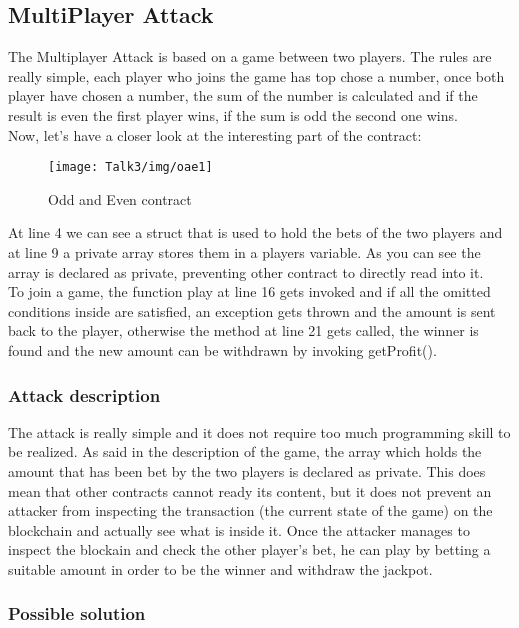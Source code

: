 \subsection{MultiPlayer Attack}
The Multiplayer Attack is based on a game between two players. The rules are really simple, each player who joins the game has top chose a number, once both player have chosen a number, the sum of the number is calculated and if the result is even the first player wins, if the sum is odd the second one wins.
\\Now, let's have a closer look at the interesting part of the contract:
\begin{figure}[H]
\begin{center}
\texttt{[image: Talk3/img/oae1]}
\end{center}
\caption{Odd and Even contract}
\label{label}
\end{figure}
At line 4 we can see a struct that is used to hold the bets of the two players and at line 9 a private array stores them in a players variable. As you can see the array is declared as private, preventing other contract to directly read into it.\\
To join a game,  the function play at line 16 gets invoked and if all the omitted conditions inside are satisfied, an exception gets thrown and the amount is sent back to the player, otherwise the method at line 21 gets called, the winner is found and the new amount can be withdrawn by invoking getProfit().
\subsubsection{Attack description}
The attack is really simple and it does not require too much programming skill to be realized. As said in the description of the game, the array which holds the amount that has been bet by the two players is declared as private. This does mean that other contracts cannot ready its content, but it does not prevent an attacker from inspecting the transaction (the current state of the game) on the blockchain and actually see what is inside it. Once the attacker manages to inspect the blockain and check the other player's bet, he can play by betting a suitable amount in order to be the winner and withdraw the jackpot.
\subsubsection{Possible solution}

